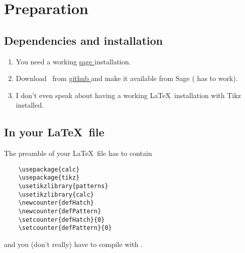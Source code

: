 \section{Preparation}

\subsection{Dependencies and installation}

\begin{enumerate}
    \item
        You need a working \href{ http://sagemath.org }{ sage } installation.
    \item
        Download \yanntricks\ from \href{ https://github.com/LaurentClaessens/yanntricks }{ github } and make it available from Sage ( has to work).
    \item
        I don't even speak about having a working \LaTeX\ installation with Tikz installed.
\end{enumerate}

\subsection{In your \LaTeX\ file}

The preamble of your \LaTeX\ file has to contain

\begin{verbatim}
    \usepackage{calc}   
    \usepackage{tikz}
    \usetikzlibrary{patterns}
    \usetikzlibrary{calc}
    \newcounter{defHatch}
    \newcounter{defPattern}
    \setcounter{defHatch}{0}
    \setcounter{defPattern}{0}
\end{verbatim}

and you (don't really) have to compile with .

